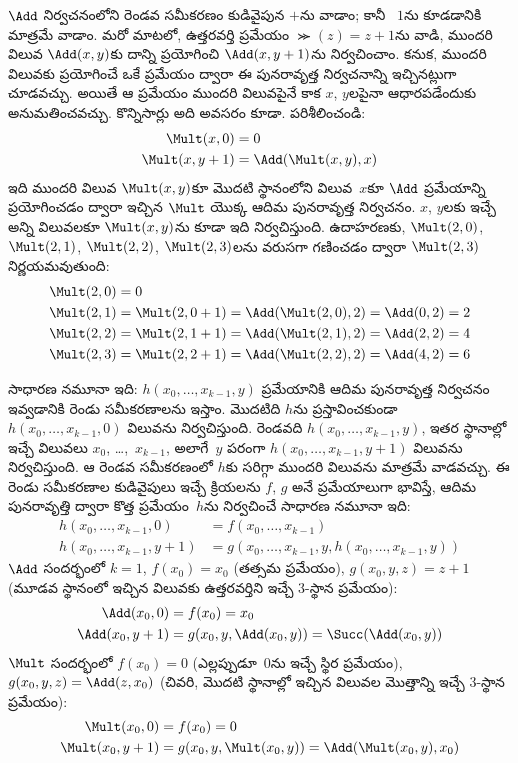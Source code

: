 \documentclass[../../../include/open-logic-section]{subfiles}
\begin{document}
$\Add$ నిర్వచనంలోని రెండవ సమీకరణం కుడివైపున $+$ను వాడాం; కానీ
~$1$ను కూడడానికి మాత్రమే వాడాం. మరో మాటలో, ఉత్తరవర్తి ప్రమేయం
$\Succ(z)=z+1$ను వాడి, ముందరి విలువ $\Add(x,y)$కు దాన్ని ప్రయోగించి
$\Add(x,y+1)$ను నిర్వచించాం. కనుక, ముందరి విలువకు ప్రయోగించే ఒకే
ప్రమేయం ద్వారా ఈ పునరావృత్త నిర్వచనాన్ని ఇచ్చినట్లుగా చూడవచ్చు. అయితే ఆ
ప్రమేయం ముందరి విలువపైనే కాక $x$, $y$లపైనా ఆధారపడేందుకు అనుమతించవచ్చు. కొన్నిసార్లు అది అవసరం కూడా. పరిశీలించండి:
\begin{align*}
  \Mult(x,0) & =  0 \\
  \Mult(x,y+1) & =  \Add(\Mult(x,y),x)
\end{align*}
ఇది ముందరి విలువ $\Mult(x,y)$కూ మొదటి స్థానంలోని విలువ~$x$కూ $\Add$
ప్రమేయాన్ని ప్రయోగించడం ద్వారా ఇచ్చిన $\Mult$ యొక్క ఆదిమ పునరావృత్త
నిర్వచనం. $x$, $y$లకు ఇచ్చే అన్ని విలువలకూ $\Mult(x,y)$ను కూడా ఇది
నిర్వచిస్తుంది. ఉదాహరణకు, $\Mult(2,0)$, $\Mult(2,1)$,
$\Mult(2,2)$, $\Mult(2,3)$లను వరుసగా గణించడం ద్వారా $\Mult(2,3)$
నిర్ణయమవుతుంది:
\begin{align*}
  \Mult(2,0) & = 0\\
  \Mult(2,1) & = \Mult(2,0+1) =
  \Add(\Mult(2,0), 2) = \Add(0, 2) = 2\\
  \Mult(2,2) & = \Mult(2,1+1) =
  \Add(\Mult(2,1), 2) = \Add(2, 2) = 4\\
  \Mult(2,3) & = \Mult(2,2+1) =
  \Add(\Mult(2,2), 2) = \Add(4, 2) = 6
\end{align*}

సాధారణ నమూనా ఇది: $h(x_0,\dots,x_{k-1},y)$ ప్రమేయానికి ఆదిమ
పునరావృత్త నిర్వచనం ఇవ్వడానికి రెండు సమీకరణాలను ఇస్తాం. మొదటిది
$h$ను ప్రస్తావించకుండా $h(x_0,\dots,x_{k-1},0)$ విలువను
నిర్వచిస్తుంది. రెండవది $h(x_0,\dots,x_{k-1},y)$, ఇతర స్థానాల్లో ఇచ్చే విలువలు
$x_0$, \dots,~$x_{k-1}$, అలాగే~$y$ పరంగా
$h(x_0,\dots,x_{k-1},y+1)$ విలువను నిర్వచిస్తుంది. ఆ రెండవ
సమీకరణంలో $h$కు సరిగ్గా ముందరి విలువను మాత్రమే వాడవచ్చు. ఈ రెండు
సమీకరణాల కుడివైపులు ఇచ్చే క్రియలను $f$, $g$ అనే ప్రమేయాలుగా
భావిస్తే, ఆదిమ పునరావృత్తి ద్వారా కొత్త ప్రమేయం~$h$ను నిర్వచించే
సాధారణ నమూనా ఇది:
\begin{align*}
  h(x_0, \dots, x_{k-1}, 0) & = f(x_0, \dots, x_{k-1})\\
  h(x_0, \dots, x_{k-1}, y+1) & =
  g(x_0, \dots, x_{k-1}, y, h(x_0, \dots, x_{k-1}, y))
\end{align*}
$\Add$ సందర్భంలో $k=1$, $f(x_0)=x_0$ (తత్సమ ప్రమేయం),
$g(x_0,y,z)=z+1$ (మూడవ స్థానంలో ఇచ్చిన విలువకు ఉత్తరవర్తిని ఇచ్చే $3$-స్థాన
ప్రమేయం):
\begin{align*}
  \Add(x_0, 0) & = f(x_0) = x_0\\
  \Add(x_0, y+1) & = g(x_0, y, \Add(x_0, y)) =
  \Succ(\Add(x_0, y))
\end{align*}
$\Mult$ సందర్భంలో $f(x_0)=0$ (ఎల్లప్పుడూ~$0$ను ఇచ్చే స్థిర
ప్రమేయం), $g(x_0,y,z)=\Add(z,x_0)$ (చివరి, మొదటి స్థానాల్లో ఇచ్చిన విలువల
మొత్తాన్ని ఇచ్చే $3$-స్థాన ప్రమేయం):
\begin{align*}
  \Mult(x_0,0) & =  f(x_0) = 0 \\
  \Mult(x_0,y+1) & =  g(x_0, y, \Mult(x_0,y)) =
  \Add(\Mult(x_0,y), x_0)
\end{align*}
\end{document}
